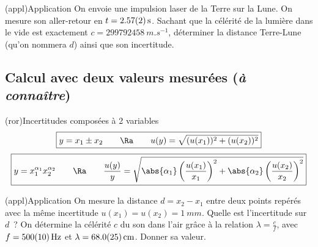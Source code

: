 \documentclass[../main/main.tex]{subfiles}
\begin{document}
\begin{tcb}[breakable](appl){Application}
	On envoie une impulsion laser de la Terre sur la Lune. On mesure son
	aller-retour en $t = \SI{2.57 \pm 0.02}{s}$. Sachant que la célérité de la
	lumière dans le vide est exactement $c = \SI{299792458}{m.s^{-1}}$, déterminer
	la distance Terre-Lune (qu'on nommera $d$) ainsi que son incertitude.
	\tcblower
	\vspace*{-10pt}
	\begin{isd}
		\vspace*{-10pt}
		\tcblower
		\vspace*{-10pt}
	\end{isd}
\end{tcb}

\subsection{Calcul avec deux valeurs mesurées (\textit{à connaître})}
\begin{tcb}(ror){Incertitudes composées à 2 variables}
	\[
		\boxed{
			y = x_1 \pm x_2
			\qquad \Ra \qquad
			u(y) = \sqrt{(u(x_1))^{2} + (u(x_2))^{2}}}
	\]
	\tcblower
	\[
		\boxed{
		y = x_1^{\alpha_1}x_2^{\alpha_2}
		\qquad \Ra \qquad
		\frac{u(y)}{y} = \sqrt{
			\abs{\alpha_1}\left(\frac{u(x_1)}{x_1}\right)^{2} +
			\abs{\alpha_2}\left(\frac{u(x_2)}{x_2}\right)^{2}
		}
		}
	\]
\end{tcb}

\begin{tcb}(appl){Application}
	On mesure la distance $d = x_2 - x_1$ entre deux points repérés avec la même
	incertitude $u(x_1) = u(x_2) = \SI{1}{mm}$. Quelle est l'incertitude sur $d$~?
	\smallbreak
	\tcblower
	On détermine la célérité $c$ du son dans l'air grâce à la relation $\lambda =
		\frac{c}{f}$, avec $f = \SI{500 \pm 10}{Hz}$ et $\lambda = \SI{68.0 \pm
			2.5}{cm}$. Donner sa valeur.
	\smallbreak
\end{tcb}
\end{document}
